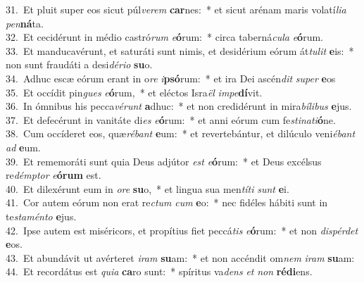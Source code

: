 {31.~}Et pluit super eos sicut púl\textit{ve}\textit{rem} \textbf{car}nes:~* et sicut arénam maris volatí\textit{li}\textit{a} \textit{pen}\textbf{ná}ta.\\
{32.~}Et cecidérunt in médio castró\textit{rum} \textit{e}\textbf{ó}rum:~* circa taberná\textit{cu}\textit{la} \textit{e}\textbf{ó}rum.\\
{33.~}Et manducavérunt, et saturáti sunt nimis, et desidérium eórum át\textit{tu}\textit{lit} \textbf{e}is:~* non sunt fraudáti a desi\textit{dé}\textit{ri}\textit{o} \textbf{su}o.\\
{34.~}Adhuc escæ eórum erant in o\textit{re} \textit{i}\textbf{psó}rum:~* et ira Dei ascén\textit{dit} \textit{su}\textit{per} \textbf{e}os\\
{35.~}Et occídit pin\textit{gues} \textit{e}\textbf{ó}rum,~* et eléctos Isra\textit{ël} \textit{im}\textit{pe}\textbf{dí}vit.\\
{36.~}In ómnibus his pecca\textit{vé}\textit{runt} \textbf{a}dhuc:~* et non credidérunt in mira\textit{bí}\textit{li}\textit{bus} \textbf{e}jus.\\
{37.~}Et defecérunt in vanitáte di\textit{es} \textit{e}\textbf{ó}rum:~* et anni eórum cum fe\textit{sti}\textit{na}\textit{ti}\textbf{ó}ne.\\
{38.~}Cum occíderet eos, quæ\textit{ré}\textit{bant} \textbf{e}um:~* et revertebántur, et dilúculo veni\textit{é}\textit{bant} \textit{ad} \textbf{e}um.\\
{39.~}Et rememoráti sunt quia Deus adjútor \textit{est} \textit{e}\textbf{ó}rum:~* et Deus excélsus re\textit{dém}\textit{ptor} \textit{e}\textbf{ó}\textbf{rum} est.\\
{40.~}Et dilexérunt eum in \textit{o}\textit{re} \textbf{su}o,~* et lingua sua men\textit{tí}\textit{ti} \textit{sunt} \textbf{e}i.\\
{41.~}Cor autem eórum non erat re\textit{ctum} \textit{cum} \textbf{e}o:~* nec fidéles hábiti sunt in te\textit{sta}\textit{mén}\textit{to} \textbf{e}jus.\\
{42.~}Ipse autem est miséricors, et propítius fiet peccá\textit{tis} \textit{e}\textbf{ó}rum:~* et non \textit{di}\textit{spér}\textit{det} \textbf{e}os.\\
{43.~}Et abundávit ut avérteret \textit{i}\textit{ram} \textbf{su}am:~* et non accéndit om\textit{nem} \textit{i}\textit{ram} \textbf{su}am:\\
{44.~}Et recordátus est \textit{qui}\textit{a} \textbf{ca}ro sunt:~* spíritus va\textit{dens} \textit{et} \textit{non} \textbf{ré}\textbf{di}ens.\\
